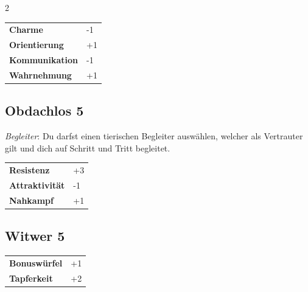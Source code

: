 \begin{multicols}{2}
\begin{tcolorbox}
\begin{tabular}{@{}ll@{}}
    \textbf{Charme} & -1\\
    \textbf{Orientierung} & +1\\
    \textbf{Kommunikation} & -1\\
    \textbf{Wahrnehmung} & +1\\
\end{tabular}


\end{tcolorbox}

\begin{tcolorbox}
    \subsection*{Obdachlos \hfill \small{5 }}
    \tcblower
\textit{Begleiter}: Du darfst einen tierischen Begleiter auswählen, welcher als Vertrauter gilt und dich auf Schritt und Tritt begleitet.


\vspace{3mm}

\begin{tabular}{@{}ll@{}}
    \textbf{Resistenz} & +3\\
    \textbf{Attraktivität} & -1\\
    \textbf{Nahkampf} & +1\\
\end{tabular}


\end{tcolorbox}

\begin{tcolorbox}
    \subsection*{Witwer \hfill \small{5 }}
    \tcblower




\begin{tabular}{@{}ll@{}}
    \textbf{Bonuswürfel} & +1\\
    \textbf{Tapferkeit} & +2\\
\end{tabular}


\end{tcolorbox}
\end{multicols}
